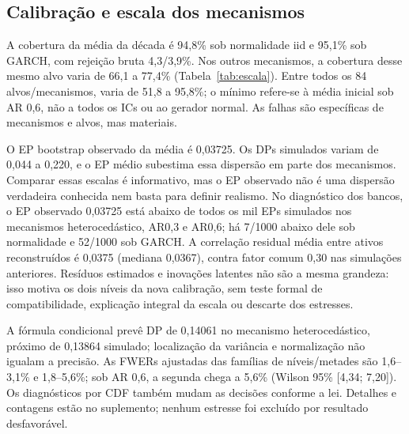 \subsection{Calibração e escala dos mecanismos}
A cobertura da média da década é 94,8\% sob normalidade iid e 95,1\%
sob GARCH, com rejeição bruta 4,3/3,9\%. Nos outros mecanismos,
a cobertura desse mesmo alvo varia de 66,1 a 77,4\% (Tabela~\ref{tab:escala}).
Entre todos os 84 alvos/mecanismos, varia de 51,8 a 95,8\%; o mínimo
refere-se à média inicial sob AR 0,6, não a todos os ICs ou ao gerador normal.
As falhas são específicas de mecanismos e alvos, mas materiais.

\begin{table}[htbp]\centering\small
\caption{Nulidade global, mil réplicas por mecanismo. DP: dispersão da média
da década; EP: média dos erros-padrão bootstrap. Cob.: cobertura nominal 95\%.
São diagnósticos condicionais, sem critério de seleção de mecanismos.}
\label{tab:escala}
\end{table}

O EP bootstrap observado da média é 0,03725. Os DPs simulados variam
de 0,044 a 0,220, e o EP médio subestima essa dispersão em parte dos
mecanismos. Comparar essas escalas é informativo, mas o EP observado
não é uma dispersão verdadeira conhecida nem basta para definir realismo.
No diagnóstico dos bancos, o EP observado 0,03725 está abaixo de
todos os mil EPs simulados nos mecanismos heterocedástico, AR0,3 e AR0,6;
há 7/1000 abaixo dele sob normalidade e 52/1000 sob GARCH.
A correlação residual média entre ativos reconstruídos é 0,0375
(mediana 0,0367), contra fator comum 0,30 nas simulações anteriores.
Resíduos estimados e inovações latentes não são a mesma grandeza:
isso motiva os dois níveis da nova calibração, sem teste formal de
compatibilidade, explicação integral da escala ou descarte dos estresses.

A fórmula condicional prevê DP de 0,14061 no mecanismo heterocedástico,
próximo de 0,13864 simulado; localização da variância e normalização não
igualam a precisão. As FWERs ajustadas das famílias de níveis/metades
são 1,6--3,1\% e 1,8--5,6\%; sob AR 0,6, a segunda chega a 5,6\%
(Wilson 95\% [4,34; 7,20]). Os diagnósticos por CDF também mudam as
decisões conforme a lei. Detalhes e contagens estão no suplemento;
nenhum estresse foi excluído por resultado desfavorável.

